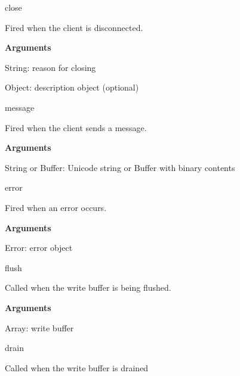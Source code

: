 \begin{DoxyItemize}
\item {\ttfamily close}
\begin{DoxyItemize}
\item Fired when the client is disconnected.
\item {\bfseries Arguments}
\begin{DoxyItemize}
\item {\ttfamily String}\+: reason for closing
\item {\ttfamily Object}\+: description object (optional)
\end{DoxyItemize}
\end{DoxyItemize}
\item {\ttfamily message}
\begin{DoxyItemize}
\item Fired when the client sends a message.
\item {\bfseries Arguments}
\begin{DoxyItemize}
\item {\ttfamily String} or {\ttfamily Buffer}\+: Unicode string or Buffer with binary contents
\end{DoxyItemize}
\end{DoxyItemize}
\item {\ttfamily error}
\begin{DoxyItemize}
\item Fired when an error occurs.
\item {\bfseries Arguments}
\begin{DoxyItemize}
\item {\ttfamily Error}\+: error object
\end{DoxyItemize}
\end{DoxyItemize}
\item {\ttfamily flush}
\begin{DoxyItemize}
\item Called when the write buffer is being flushed.
\item {\bfseries Arguments}
\begin{DoxyItemize}
\item {\ttfamily Array}\+: write buffer
\end{DoxyItemize}
\end{DoxyItemize}
\item {\ttfamily drain}
\begin{DoxyItemize}
\item Called when the write buffer is drained
\end{DoxyItemize}

\end{DoxyItemize}
